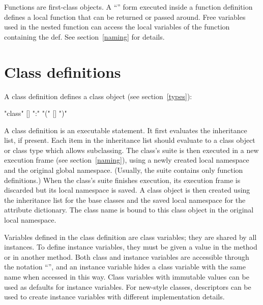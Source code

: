  Functions are first-class objects.  A
``'' form executed inside a function definition defines a
local function that can be returned or passed around.  Free variables
used in the nested function can access the local variables of the
function containing the def.  See section~\ref{naming} for details.


\section{Class definitions\label{class}}

A class definition defines a class object (see section~\ref{types}):

\begin{productionlist}
             {"class"  [] ":"
              }
             {"(" [] ")"}
             {}
\end{productionlist}

A class definition is an executable statement.  It first evaluates the
inheritance list, if present.  Each item in the inheritance list
should evaluate to a class object or class type which allows
subclassing.  The class's suite is then executed
in a new execution frame (see section~\ref{naming}), using a newly
created local namespace and the original global namespace.
(Usually, the suite contains only function definitions.)  When the
class's suite finishes execution, its execution frame is discarded but
its local namespace is saved.  A class object is then created using
the inheritance list for the base classes and the saved local
namespace for the attribute dictionary.  The class name is bound to this
class object in the original local namespace.

 Variables defined in the class definition
are class variables; they are shared by all instances.  To define
instance variables, they must be given a value in the
 method or in another method.  Both class and
instance variables are accessible through the notation
``'', and an instance variable hides a class variable
with the same name when accessed in this way.  Class variables with
immutable values can be used as defaults for instance variables.
For new-style classes, descriptors can be used to create instance
variables with different implementation details.
